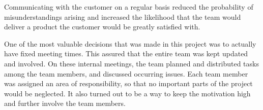 Communicating with the customer on a regular basis reduced the probability of misunderstandings arising and increased the likelihood that the team would deliver a product the customer would be greatly satisfied with. 

One of the most valuable decisions that was made in this project was to actually have fixed meeting times. This assured that the entire team was kept updated and involved. On these internal meetings, the team planned and distributed tasks among the team members, and discussed occurring issues. Each team member was assigned an area of responsibility, so that no important parts of the project would be neglected. It also turned out to be a way to keep the motivation high and further involve the team members.